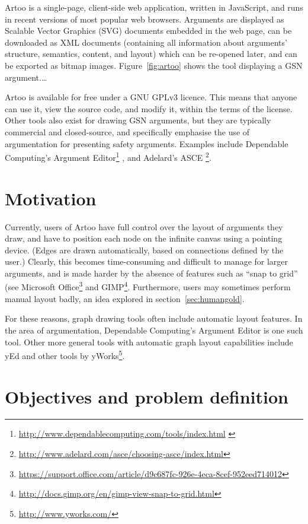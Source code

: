 Artoo is a single-page, client-side web application, written in JavaScript, and runs in recent versions of most popular web browsers.
Arguments are displayed as Scalable Vector Graphics (SVG) documents embedded in the web page, can be downloaded as XML documents (containing all information about arguments' structure, semantics, content, and layout) which can be re-opened later, and can be exported as bitmap images.
Figure~\ref{fig:artoo} shows the tool displaying a GSN argument.\ldots

Artoo is available for free under a GNU GPLv3 licence.
This means that anyone can use it, view the source code, and modify it, within the terms of the license.
Other tools also exist for drawing GSN arguments, but they are typically commercial and closed-source, and specifically emphasise the use of argumentation for presenting safety arguments.
Examples include Dependable Computing's
Argument Editor\footnote{\url{http://www.dependablecomputing.com/tools/index.html} \label{fn:depcomp}}
, and Adelard's
ASCE \footnote{\url{http://www.adelard.com/asce/choosing-asce/index.html}}.


\section{Motivation}

Currently, users of Artoo have full control over the layout of arguments they draw, and have to position each node on the infinite canvas using a pointing device.
(Edges are drawn automatically, based on connections defined by the user.)
Clearly, this becomes time-consuming and difficult to manage for larger arguments, and is made harder by the absence of features such as ``snap to grid''
(see Microsoft Office\footnote{\url{https://support.office.com/article/d9c687fc-926e-4eca-8cef-952eed714012}}
and GIMP\footnote{\url{http://docs.gimp.org/en/gimp-view-snap-to-grid.html}}.
Furthermore, users may sometimes perform manual layout badly, an idea explored in section~\ref{sec:humangold}.

For these reasons, graph drawing tools often include automatic layout features.
In the area of argumentation, Dependable Computing's Argument Editor is one such tool. 
Other more general tools with automatic graph layout capabilities include yEd and other tools by yWorks\footnote{\url{http://www.yworks.com/}}.


\section{Objectives and problem definition}

